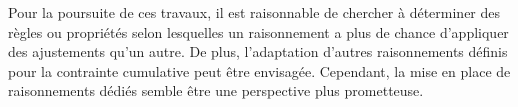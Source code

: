 Pour la poursuite de ces travaux, il est raisonnable de chercher à
déterminer des règles ou propriétés selon lesquelles un raisonnement a
plus de chance d'appliquer des ajustements qu'un autre. De plus,
l'adaptation d'autres raisonnements définis pour la contrainte
cumulative peut être envisagée. Cependant, la mise en place de
raisonnements dédiés semble être une perspective plus prometteuse. 
